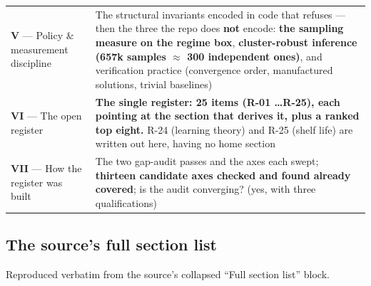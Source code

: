 \begin{longtable}{@{}L{2.2cm} L{12.8cm}@{}}
\textbf{V} --- Policy \& measurement discipline &
The structural invariants encoded in code that refuses --- then the three the
repo does \textbf{not} encode: \textbf{the sampling measure on the regime box},
\textbf{cluster-robust inference (657k samples $\approx$ 300 independent ones)},
and verification practice (convergence order, manufactured solutions, trivial
baselines) \\

\textbf{VI} --- The open register &
\textbf{The single register: 25 items (R-01 \ldots R-25), each pointing at the
section that derives it, plus a ranked top eight.} R-24 (learning theory) and
R-25 (shelf life) are written out here, having no home section \\

\textbf{VII} --- How the register was built &
The two gap-audit passes and the axes each swept; \textbf{thirteen candidate
axes checked and found already covered}; is the audit converging? (yes, with
three qualifications) \\
\end{longtable}
\endgroup

\subsection{The source's full section list}
\label{app:sourcelist}

Reproduced verbatim from the source's collapsed ``Full section list'' block.

